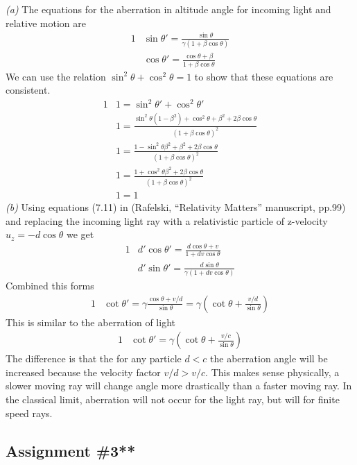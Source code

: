 \documentclass[]{article}
\numberwithin{equation}{subsection}
\begin{document}
\noindent \emph{(a)} The equations for the aberration in altitude angle for incoming light and relative motion are
\begin{alignat}{1}
	\label{b17}	&\sin\theta'=\frac{\sin\theta}{\gamma(1+\beta\cos\theta)}\\
	\label{b18}	&\cos\theta'=\frac{\cos\theta+\beta}{1+\beta\cos\theta}
\end{alignat}
We can use the relation $\sin^{2}\theta+\cos^{2}\theta=1$ to show that these equations are consistent.
\begin{alignat}{1}
	\label{b19}	&1=\sin^{2}\theta'+\cos^{2}\theta'\\
	\label{b20}	&1=\frac{\sin^{2}\theta(1-\beta^{2})+\cos^{2}\theta+\beta^{2}+2\beta\cos\theta}{(1+\beta\cos\theta)^{2}}\\
	\label{b21}	&1=\frac{1-\sin^{2}\theta\beta^{2}+\beta^{2}+2\beta\cos\theta}{(1+\beta\cos\theta)^{2}}\\
	\label{b22}	&1=\frac{1+\cos^{2}\theta\beta^{2}+2\beta\cos\theta}{(1+\beta\cos\theta)^{2}}\\
	\label{b23}	&1=1
\end{alignat}
\emph{(b)} Using equations (7.11) in (Rafelski, ``Relativity Matters'' manuscript, pp.99) and replacing the incoming light ray with a relativistic particle of z-velocity $u_{z}=-d\cos\theta$ we get
\begin{alignat}{1}
	\label{b24}	&d'\cos\theta'=\frac{d\cos\theta+v}{1+dv\cos\theta}\\
	\label{b25}	&d'\sin\theta'=\frac{d\sin\theta}{\gamma(1+dv\cos\theta)}
\end{alignat}
Combined this forms  
\begin{alignat}{1}
	\label{b26}	&\cot\theta'=\gamma\frac{\cos\theta+v/d}{\sin\theta}=\gamma(\cot\theta+\frac{v/d}{\sin\theta})
\end{alignat}
This is similar to the aberration of light
\begin{alignat}{1}
	\label{b27}	&\cot\theta'=\gamma(\cot\theta+\frac{v/c}{\sin\theta})
\end{alignat}
The difference is that the for any particle $d<c$ the aberration angle will be increased because the velocity factor $v/d>v/c$. This makes sense physically, a slower moving ray will change angle more drastically than a faster moving ray. In the classical limit, aberration will not occur for the light ray, but will for finite speed rays.
\subsection{Assignment \#3**}
\end{document}
